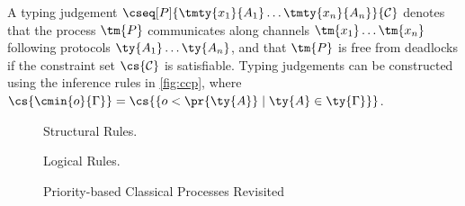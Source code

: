 \begin{definition}\label{def:ccp-typing}
  A typing judgement
  $\cseq[P]{\tmty{x_1}{A_1}\dots\tmty{x_n}{A_n}}{\mathcal{C}}$ denotes that the
  process $\tm{P}$ communicates along channels $\tm{x_1}\dots\tm{x_n}$ following
  protocols $\ty{A_1}\dots\ty{A_n}$, and that $\tm{P}$ is free from deadlocks if
  the constraint set $\cs{\mathcal{C}}$ is satisfiable.
  Typing judgements can be constructed using the inference rules in
  \cref{fig:ccp}, where $\cs{\cmin{o}{\Gamma}} = \cs{\{ o < \pr{\ty{A}} \mid
    \ty{A} \in \ty{\Gamma} \}}$.
\end{definition}
\begin{figure*}[!htb]
  Structural Rules.
  \begin{center} \cccpInfAx    \cccpInfCycle \end{center}\vspace*{1\baselineskip}
  \begin{center} \cccpInfMix   \cccpInfHalt  \end{center}\vspace*{1\baselineskip}
  
  Logical Rules.
  \begin{center} \cccpInfTens  \cccpInfParr  \end{center}\vspace*{1\baselineskip}
  \begin{center} \cccpInfOne   \cccpInfBot   \end{center}\vspace*{1\baselineskip}
  \begin{center}   \end{center}\vspace*{1\baselineskip}
  \begin{center} \cccpInfWith                \end{center}\vspace*{1\baselineskip}
  \begin{center} \cccpInfNil   \cccpInfTop   \end{center} 

  \caption{Priority-based Classical Processes Revisited}
  \label{fig:cccp}
\end{figure*}
